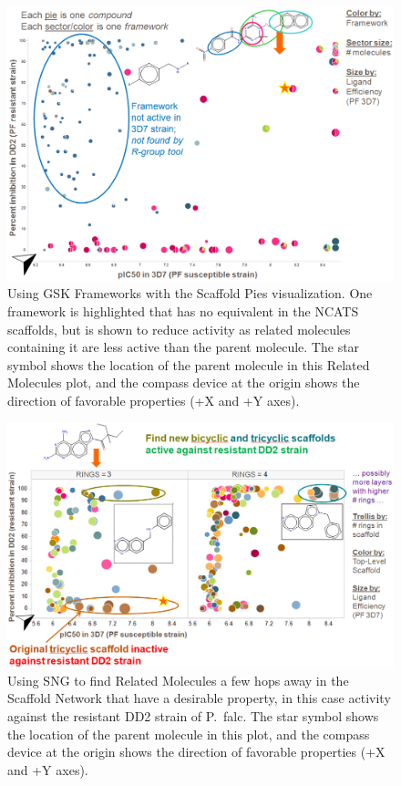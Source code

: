 \documentclass[journal=jacsat,manuscript=article]{achemso}
\begin{document}
\begin{figure}
\includegraphics[width=5in]{fig/mol1_frames_scafpie.png}
\caption{Using GSK Frameworks with the Scaffold Pies visualization. One framework is highlighted that has no equivalent in the NCATS scaffolds, but is shown to reduce activity as related molecules containing it are less active than the parent molecule.   The star symbol shows the location of the parent molecule in this Related Molecules plot, and the compass device at the origin shows the direction of favorable properties (+X and +Y axes).}      
\label{fig:frameswalk}
\end{figure}

\begin{figure}
\includegraphics[width=5in]{fig/mol2_SNG_relmol_trellis.png}
\caption{Using SNG to find Related Molecules a few hops away in the Scaffold Network that have a desirable property, in this case activity against the resistant DD2 strain of P.~falc.  The star symbol shows the location of the parent molecule in this plot, and the compass device at the origin shows the direction of favorable properties (+X and +Y axes).}
\label{fig:SNGwalk}
\end{figure}
\end{document}
